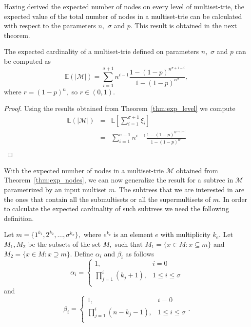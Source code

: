 Having derived the expected number of nodes on every level of multiset-trie, the
expected value of the total number of nodes in a multiset-trie can be calculated 
with respect to the parameters $n,$ $\sigma$ and $p.$ This result is obtained in 
the next theorem.

\begin{theorem}\label{thm:exp_nodes}
The expected cardinality of a multiset-trie defined on parameters $n,$ $\sigma$ 
and $p$ can be computed as 
\begin{equation}
\mathbb{E}( | \mathcal{M} | ) = \sum_{i=1}^{\sigma+1} n^{i-1} \frac{1-(1-p)^{n^{\sigma +1 -i}}}{1-(1-p)^{n^{\sigma}}},
\end{equation}
where $r = (1-p)^n,$ so $r\in(0,1).$
\end{theorem}
\begin{proof}
Using the results obtained from Theorem~\ref{thm:exp_level} we compute 
\begin{eqnarray*}
\mathbb{E}( | \mathcal{M} | ) &=& \mathbb{E}\left[ \sum_{i=1}^{\sigma+1} \xi_i \right] \\
&=& \sum_{i=1}^{\sigma + 1} n^{i-1} \frac{1-(1-p)^{n^{\sigma + 1 -i}}}{1-(1-p)^{n^{\sigma}}} \\
\end{eqnarray*}

\end{proof}

With the expected number of nodes in a multiset-trie $\mathcal{M}$ obtained from 
Theorem~\ref{thm:exp_nodes}, we can now generalize the result for a subtree 
in $\mathcal{M}$ parametrized by an input multiset $m.$ The subtrees that we 
are interested in are the ones that contain all the submultisets or all the 
supermultisets of $m.$ In order to calculate the expected cardinality of such 
subtrees we need the following definition. 

\begin{definition}\label{def:params}
Let $m = \{ 1^{k_1}, 2^{k_2}, \ldots, \sigma^{k_\sigma} \},$ where 
$e^{k_e}$ is an element $e$ with multiplicity $k_e.$ Let $M_1, M_2$ be 
the subsets of the set $M,$ such that $M_1 = \{ x\in M : x\subseteq m \}$ and 
$M_2 = \{ x\in M : x\supseteq m \}.$
Define $\alpha_i$ and $\beta_i$ as follows 
\begin{equation*}
\alpha_i = \begin{cases}
1, & i=0 \\
\prod_{j=1}^i (k_j+1), & 1\leq i\leq\sigma \\
\end{cases}
\end{equation*} 
and 
\begin{equation*}
\beta_i = \begin{cases}
1, & i=0 \\
\prod_{j=1}^i (n-k_j-1), & 1\leq i\leq\sigma \\
\end{cases}.
\end{equation*}
\end{definition}

